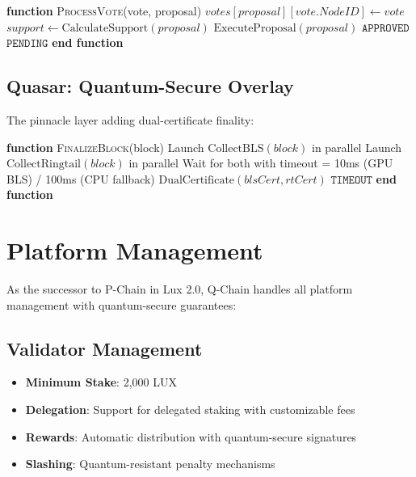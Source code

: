 \documentclass[11pt]{article}
\begin{document}
\begin{algorithmic}[1]
\State \textbf{function} \textsc{ProcessVote}(vote, proposal)
    \State $votes[proposal][vote.NodeID] \gets vote$
    \State $support \gets \text{CalculateSupport}(proposal)$
        \State $\text{ExecuteProposal}(proposal)$
        \State \Return $\texttt{APPROVED}$
    \EndIf
    \State \Return $\texttt{PENDING}$
\State \textbf{end function}
\end{algorithmic}


\subsection{Quasar: Quantum-Secure Overlay}

The pinnacle layer adding dual-certificate finality:



\begin{algorithmic}[1]
\State \textbf{function} \textsc{FinalizeBlock}(block)
    \State Launch $\text{CollectBLS}(block)$ in parallel
    \State Launch $\text{CollectRingtail}(block)$ in parallel
    \State Wait for both with timeout = 10ms (GPU BLS) / 100ms (CPU fallback)
        \State \Return $\text{DualCertificate}(blsCert, rtCert)$
    \Else
        \State \Return $\texttt{TIMEOUT}$ 
    \EndIf
\State \textbf{end function}
\end{algorithmic}


\section{Platform Management}

As the successor to P-Chain in Lux 2.0, Q-Chain handles all platform management with quantum-secure guarantees:

\subsection{Validator Management}

\begin{itemize}
\item \textbf{Minimum Stake}: 2,000 LUX
\item \textbf{Delegation}: Support for delegated staking with customizable fees
\item \textbf{Rewards}: Automatic distribution with quantum-secure signatures
\item \textbf{Slashing}: Quantum-resistant penalty mechanisms
\end{itemize}
\end{document}
